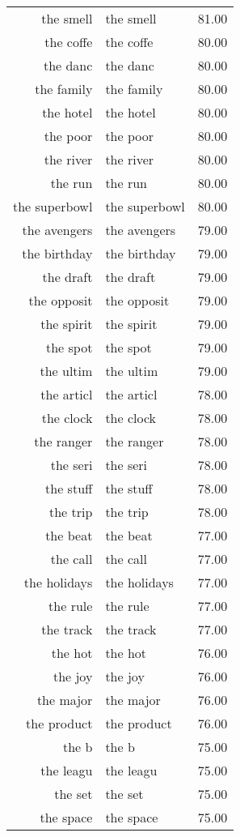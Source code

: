 \begin{table}[ht]
\begin{tabular}{rlr}
  the smell & the smell & 81.00 \\ 
  the coffe & the coffe & 80.00 \\ 
  the danc & the danc & 80.00 \\ 
  the family & the family & 80.00 \\ 
  the hotel & the hotel & 80.00 \\ 
  the poor & the poor & 80.00 \\ 
  the river & the river & 80.00 \\ 
  the run & the run & 80.00 \\ 
  the superbowl & the superbowl & 80.00 \\ 
  the avengers & the avengers & 79.00 \\ 
  the birthday & the birthday & 79.00 \\ 
  the draft & the draft & 79.00 \\ 
  the opposit & the opposit & 79.00 \\ 
  the spirit & the spirit & 79.00 \\ 
  the spot & the spot & 79.00 \\ 
  the ultim & the ultim & 79.00 \\ 
  the articl & the articl & 78.00 \\ 
  the clock & the clock & 78.00 \\ 
  the ranger & the ranger & 78.00 \\ 
  the seri & the seri & 78.00 \\ 
  the stuff & the stuff & 78.00 \\ 
  the trip & the trip & 78.00 \\ 
  the beat & the beat & 77.00 \\ 
  the call & the call & 77.00 \\ 
  the holidays & the holidays & 77.00 \\ 
  the rule & the rule & 77.00 \\ 
  the track & the track & 77.00 \\ 
  the hot & the hot & 76.00 \\ 
  the joy & the joy & 76.00 \\ 
  the major & the major & 76.00 \\ 
  the product & the product & 76.00 \\ 
  the b & the b & 75.00 \\ 
  the leagu & the leagu & 75.00 \\ 
  the set & the set & 75.00 \\ 
  the space & the space & 75.00 \\ 

\end{tabular}
\end{table}
